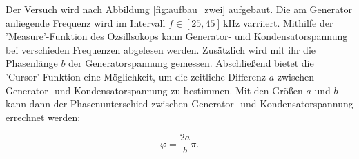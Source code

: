 Der Versuch wird nach Abbildung \ref{fig:aufbau_zwei} aufgebaut.
Die am Generator anliegende Frequenz wird im Intervall $f\in\left[25,45\right]\,\si{\kilo\hertz}$
varriiert. Mithilfe der 'Measure'-Funktion des Ozsillsokops
kann Generator- und Kondensatorspannung bei verschieden Frequenzen
abgelesen werden. Zusätzlich wird mit ihr die Phasenlänge $b$ der Generatorspannung
gemessen. Abschließend bietet die 'Cursor'-Funktion eine Möglichkeit, um
die zeitliche Differenz $a$ zwischen Generator- und Kondensatorspannung zu
bestimmen.
Mit den Größen $a$ und $b$ kann dann der Phasenunterschied zwischen
Generator- und Kondensatorspannung errechnet werden:

\begin{equation}
  \label{eq:phasen_unterschied}
  \varphi=\frac{2a}{b}\pi.
\end{equation}
